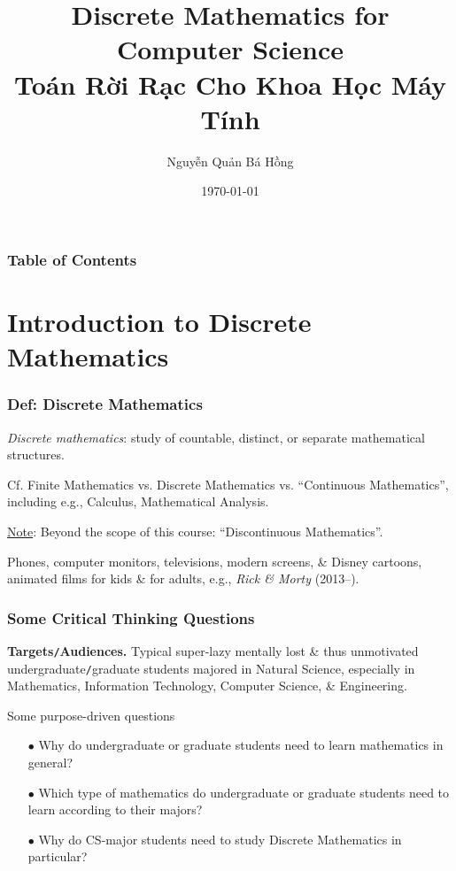 \documentclass{beamer}
\title{Discrete Mathematics for Computer Science\\Toán Rời Rạc Cho Khoa Học Máy Tính}
\author{\sc Nguyễn Quản Bá Hồng}
\institute{UMT, HCMC -- University of Management \& Technology, Ho Chi Minh City}
\date{\today}
\begin{document}
\frame{\titlepage}
\begin{frame}
	\frametitle{Table of Contents}
	\tableofcontents
\end{frame}

\section{Introduction to Discrete Mathematics}

\begin{frame}
	\frametitle{Def: Discrete Mathematics}
	
	\begin{definition}
		\emph{Discrete mathematics}: study of countable, distinct, or separate mathematical structures.
	\end{definition}
	Cf. Finite Mathematics vs. Discrete Mathematics vs. ``Continuous Mathematics'', including e.g., Calculus, Mathematical Analysis.
	\vspace{2mm}
	
	\underline{Note}: Beyond the scope of this course: ``Discontinuous Mathematics''.
	
	\begin{example}[Pixel]
		Phones, computer monitors, televisions, modern screens, \& Disney cartoons, animated films for kids \& for adults, e.g., {\it Rick \& Morty} (2013--).
	\end{example}
\end{frame}

\begin{frame}
	\frametitle{Some Critical Thinking Questions}
	{\bf Targets{\tt/}Audiences.} Typical super-lazy mentally lost \& thus unmotivated undergraduate{\tt/}graduate students majored in Natural Science, especially in Mathematics, Information Technology, Computer Science, \& Engineering.
	\begin{block}{Some purpose-driven questions}
		\begin{itemize}\it
			\item[$\bullet$] Why do undergraduate or graduate students need to learn mathematics in general?
			\item[$\bullet$] Which type of mathematics do undergraduate or graduate students need to learn according to their majors?
			\item[$\bullet$] Why do CS-major students need to study Discrete Mathematics in particular?
		\end{itemize}
	\end{block}
\end{frame}
\end{document}
